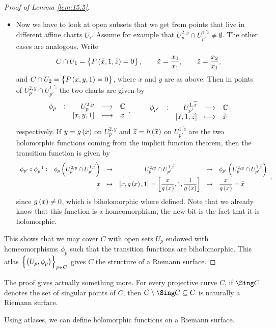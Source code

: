 \begin{proof}[Proof of Lemma \ref{lem:15.5}]
\begin{itemize}
\item Now we have to look at open subsets that we get from points that live in different affine charts $ U_i $. Assume for example that $ U_p^{2, y} \cap U_{p'}^{1, \widetilde{z}} \ne \emptyset $. The other cases are analogous. Write
$$ C \cap U_1 = \cbr{P\br{\widetilde{x}, 1, \widetilde{z}} = 0}, \qquad \tilde{x} = \dfrac{x_0}{x_1}, \qquad \tilde{z} = \dfrac{x_2}{x_1}, $$
and $ C \cap U_2 = \cbr{P\br{x, y, 1} = 0} $, where $ x $ and $ y $ are as above. Then in points of $ U_p^{2, y} \cap U_{p'}^{1, \widetilde{z}} $ the two charts are given by
$$ \function[\phi_p]{U_p^{2, y}}{\CC}{\sbr{x, y, 1}}{x}, \qquad \function[\phi_{p'}]{U_{p'}^{1, \widetilde{z}}}{\CC}{\sbr{\widetilde{x}, 1, \widetilde{z}}}{\widetilde{x}} $$
respectively. If $ y = g\br{x} $ on $ U_p^{2, y} $ and $ \widetilde{z} = h\br{\widetilde{x}} $ on $ U_{p'}^{1, \widetilde{z}} $ are the two holomorphic functions coming from the implicit function theorem, then the transition function is given by
$$
\begin{array}{crcccl}
\phi_{p'} \circ \phi_p^{-1} : & \phi_p\br{U_p^{2, y} \cap U_{p'}^{1, \widetilde{z}}} & \to & U_p^{2, y} \cap U_{p'}^{1, \widetilde{z}} & \to & \phi_{p'}\br{U_p^{2, y} \cap U_{p'}^{1, \widetilde{z}}} \\
& x & \mapsto & \sbr{x, g\br{x}, 1} = \sbr{\dfrac{x}{g\br{x}}, 1, \dfrac{1}{g\br{x}}} & \mapsto & \dfrac{x}{g\br{x}} = \widetilde{x}
\end{array},
$$
since $ g\br{x} \ne 0 $, which is biholomorphic where defined. Note that we already know that this function is a homeomorphism, the new bit is the fact that it is holomorphic.
\end{itemize}
This shows that we may cover $ C $ with open sets $ U_p $ endowed with homeomorphisms $ \phi_p $ such that the transition functions are biholomorphic. This atlas $ \cbr{\br{U_p, \phi_p}}_{p \in C} $ gives $ C $ the structure of a Riemann surface.
\end{proof}


\begin{remark}
The proof gives actually something more. For every projective curve $ C $, if $ \Sing C $ denotes the set of singular points of $ C $, then $ C \setminus \Sing C \subseteq C $ is naturally a Riemann surface.
\end{remark}

\pagebreak

Using atlases, we can define holomorphic functions on a Riemann surface.

